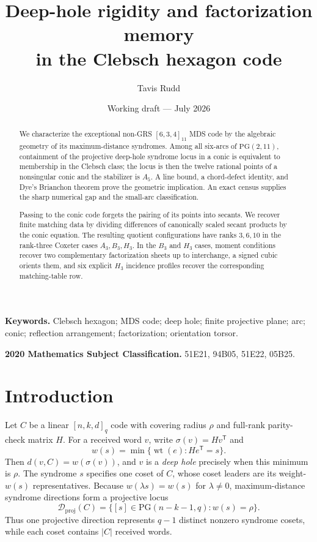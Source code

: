 \documentclass[11pt]{article}
\title{Deep-hole rigidity and factorization memory\\
in the Clebsch hexagon code}
\author{Tavis Rudd}
\date{Working draft --- July 2026}
\theoremstyle{definition}
\theoremstyle{remark}
\newcommand{\PG}{\mathrm{PG}}
\begin{document}
\maketitle

\begin{abstract}
We characterize the exceptional non-GRS $[6,3,4]_{11}$ MDS code by the
algebraic geometry of its maximum-distance syndromes.  Among all six-arcs
of $\PG(2,11)$, containment of the projective deep-hole syndrome locus in
a conic is equivalent to membership in the Clebsch class; the locus is
then the twelve rational points of a nonsingular conic and the stabilizer
is $A_5$.  A line bound, a chord-defect identity, and Dye's Brianchon
theorem prove the geometric implication.  An exact census supplies the
sharp numerical gap and the small-arc classification.

Passing to the conic code forgets the pairing of its points into secants.
We recover finite matching data by dividing differences of canonically
scaled secant products by the conic equation.  The resulting quotient
configurations have ranks $3,6,10$ in the rank-three Coxeter cases
$A_3,B_3,H_3$.  In the $B_3$ and $H_3$ cases, moment conditions recover
two complementary factorization sheets up to interchange, a signed cubic
orients them, and six explicit $H_3$ incidence profiles recover the
corresponding matching-table row.

\end{abstract}

\noindent\textbf{Keywords.} Clebsch hexagon; MDS code; deep hole; finite
projective plane; arc; conic; reflection arrangement; factorization;
orientation torsor.

\smallskip
\noindent\textbf{2020 Mathematics Subject Classification.} 51E21, 94B05,
51E22, 05B25.

\section{Introduction}
\label{sec:intro}

Let $C$ be a linear $[n,k,d]_q$ code with covering radius $\rho$ and
full-rank parity-check matrix $H$. For a received word $v$, write
$\sigma(v)=Hv^{\mathsf T}$ and
\[
 w(s)=\min\{\operatorname{wt}(e):He^{\mathsf T}=s\}.
\]
Then $d(v,C)=w(\sigma(v))$, and $v$ is a \emph{deep hole} precisely when
this minimum is $\rho$. The syndrome $s$ specifies one coset of $C$, whose
coset leaders are its weight-$w(s)$ representatives. Because
$w(\lambda s)=w(s)$ for $\lambda\ne0$, maximum-distance syndrome directions
form a projective locus
\[
 \mathcal D_{\mathrm{proj}}(C)=
 \{[s]\in\PG(n-k-1,q):w(s)=\rho\}.
\]
Thus one projective direction represents $q-1$ distinct nonzero syndrome
cosets, while each coset contains $|C|$ received words.
\end{document}
